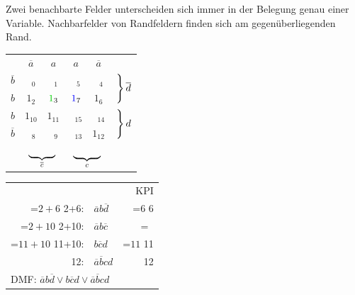 \documentclass[10pt,a4paper]{scrartcl}
\newcommand\hcancel[2][black]{\setbox0=\hbox{$#2$}%
	\rlap{\raisebox{.45\ht0}{\textcolor{#1}{\rule{\wd0}{1pt}}}}#2}
\begin{document}
\begin{Hint}{}{}
	Zwei benachbarte Felder unterscheiden sich immer in der Belegung genau einer Variable. Nachbarfelder von Randfeldern finden sich am gegenüberliegenden Rand.
\end{Hint}

\begin{table}[h!]
	\centering
	\begin{tabular}{c|c|c|c|c|l}
		& $ \overline{a} $ & $ a $ & $ a $ & $ \overline{a} $ &\\ \cline{1-5}
		$ \overline{b} $ & $ \phantom{a}_0 $ & $ \phantom{a}_1 $ & $ \phantom{a}_5 $ & $ \phantom{a}_4 $& \multirow{2}{*}{$\begin{rcases*} \\ \\ \end{rcases*} \overline{d}$}\\ \cline{1-5}
		$ b $ & $ 1_2 $ & $ {\textcolor{green!80!black}{1}}_3 $ & $ {\textcolor{blue}{1}}_7 $ & $ 1_6 $ \\ \cline{1-5}
		$ b $ & $ 1_{10} $ & $ 1_{11} $ & $ \phantom{a}_{15} $ & $ \phantom{a}_{14} $ & \multirow{2}{*}{$ \begin{rcases*} \\ \\ \end{rcases*} d $}\\ \cline{1-5}
		$ \overline{b} $ & $ \phantom{a}_{8} $ & $ \phantom{a}_{9} $ & $ \phantom{a}_{13} $ & $ 1_{12} $ \\ \cline{1-5}
		\multicolumn{1}{c}{}& \multicolumn{2}{c}{$ \underbrace{\hspace*{\dimexpr2\tabcolsep+1\arrayrulewidth}\hphantom{012}}_{\overline{c}} $}& \multicolumn{2}{c}{$ \underbrace{\hspace*{\dimexpr2\tabcolsep+1\arrayrulewidth}\hphantom{012}}_{c} $}
	\end{tabular}
	\quad
	\begin{tabular}{rlr}
		&& \ac{KPI}\\
		\hcancel[green!80!black]{2+6}: & $ \overline{a} b \overline{d} $ & \hcancel 6\\
		\hcancel[green!80!black]{2+10}:&$ \overline{a} b \overline{c} $ & \hcancel{\phantom{a}}\\
		\hcancel[green!80!black]{11+10}: & $ b\overline{c} d $& \hcancel[green!80!black]{11}\\
		12: & $ \overline{a}\overline{b}cd $ & 12\\
		\multicolumn{3}{l}{DMF: $ \overline{a} b \overline{d} \vee b\overline{c}d \vee \overline{a}\overline{b}cd $}\\

\end{tabular}
\end{table}
\end{document}
